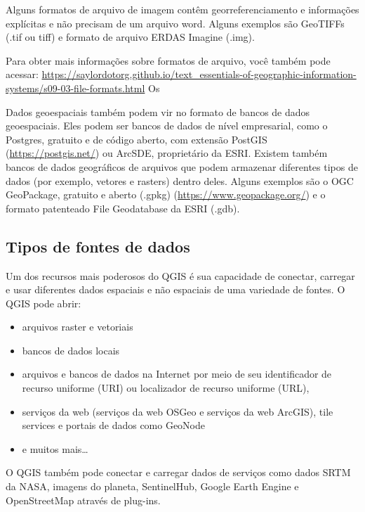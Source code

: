 \documentclass[
]{krantz}
\providecommand{\tightlist}{%
  \setlength{\itemsep}{0pt}\setlength{\parskip}{0pt}}
\begin{document}
Alguns formatos de arquivo de imagem contêm georreferenciamento e informações explícitas e não precisam de um arquivo word. Alguns exemplos são GeoTIFFs (.tif ou tiff) e formato de arquivo ERDAS Imagine (.img).

Para obter mais informações sobre formatos de arquivo, você também pode acessar: \href{https://saylordotorg.\%20github.io/text_essentials-of-geographic-information-systems/s09-03-file-formats.html}{https://saylordotorg.github.io/text\_essentials-of-geographic-information-systems/s09-03-file-formats.html} Os

Dados geoespaciais também podem vir no formato de bancos de dados geoespaciais. Eles podem ser bancos de dados de nível empresarial, como o Postgres, gratuito e de código aberto, com extensão PostGIS (\url{https://postgis.net/}) ou ArcSDE, proprietário da ESRI. Existem também bancos de dados geográficos de arquivos que podem armazenar diferentes tipos de dados (por exemplo, vetores e rasters) dentro deles. Alguns exemplos são o OGC GeoPackage, gratuito e aberto (.gpkg) (\url{https://www.geopackage.org/}) e o formato patenteado File Geodatabase da ESRI (.gdb).

\hypertarget{tipos-de-fontes-de-dados}{%
\subsection{Tipos de fontes de dados}\label{tipos-de-fontes-de-dados}}

Um dos recursos mais poderosos do QGIS é sua capacidade de conectar, carregar e usar diferentes dados espaciais e não espaciais de uma variedade de fontes. O QGIS pode abrir:

\begin{itemize}
\tightlist
\item
  arquivos raster e vetoriais
\item
  bancos de dados locais
\item
  arquivos e bancos de dados na Internet por meio de seu identificador de recurso uniforme (URI) ou localizador de recurso uniforme (URL),
\item
  serviços da web (serviços da web OSGeo e serviços da web ArcGIS), tile services e portais de dados como GeoNode
\item
  e muitos mais\ldots{}
\end{itemize}

O QGIS também pode conectar e carregar dados de serviços como dados SRTM da NASA, imagens do planeta, SentinelHub, Google Earth Engine e OpenStreetMap através de plug-ins.
\end{document}
